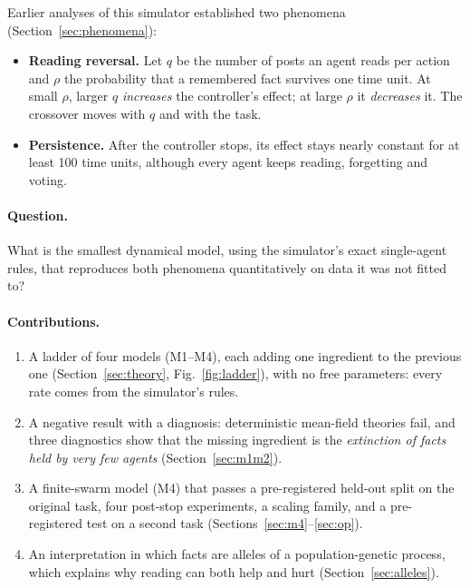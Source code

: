\documentclass[10pt,a4paper]{article}
\begin{document}
Earlier analyses of this simulator established two phenomena (Section~\ref{sec:phenomena}):
\begin{itemize}
\item \textbf{Reading reversal.} Let $q$ be the number of posts an agent reads per action and $\rho$ the probability that
  a remembered fact survives one time unit. At small $\rho$, larger $q$ \emph{increases} the controller's effect; at
  large $\rho$ it \emph{decreases} it. The crossover moves with $q$ and with the task.
\item \textbf{Persistence.} After the controller stops, its effect stays nearly constant for at least 100 time units,
  although every agent keeps reading, forgetting and voting.
\end{itemize}

\paragraph{Question.} What is the smallest dynamical model, using the simulator's exact single-agent rules, that
reproduces both phenomena quantitatively on data it was not fitted to?

\paragraph{Contributions.}
\begin{enumerate}
\item A ladder of four models (M1--M4), each adding one ingredient to the previous one (Section~\ref{sec:theory},
  Fig.~\ref{fig:ladder}), with no free parameters: every rate comes from the simulator's rules.
\item A negative result with a diagnosis: deterministic mean-field theories fail, and three diagnostics show that the
  missing ingredient is the \emph{extinction of facts held by very few agents} (Section~\ref{sec:m1m2}).
\item A finite-swarm model (M4) that passes a pre-registered held-out split on the original task, four post-stop
  experiments, a scaling family, and a pre-registered test on a second task (Sections~\ref{sec:m4}--\ref{sec:op}).
\item An interpretation in which facts are alleles of a population-genetic process, which explains why reading can
  both help and hurt (Section~\ref{sec:alleles}).
\end{enumerate}

\end{document}
